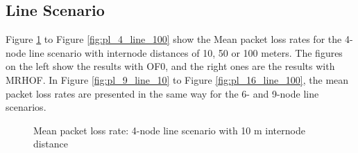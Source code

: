 \subsection{Line Scenario}
\label{pl:line}
Figure \ref{fig:pl_4_line_10} to Figure \ref{fig:pl_4_line_100} show the Mean packet loss rates for the 4-node line scenario with internode distances of 10, 50 or 100 meters. The figures on the left show the results with OF0, and the right ones are the results with MRHOF. In Figure \ref{fig:pl_9_line_10} to Figure \ref{fig:pl_16_line_100}, the mean packet loss rates are presented in the same way for the 6- and 9-node line scenarios.


\begin{figure}[p]
  \centering
    \leavevmode
   \caption{Mean packet loss rate: 4-node line scenario with 10 m internode distance}
   \label{fig:pl_4_line_10}
\end{figure}

